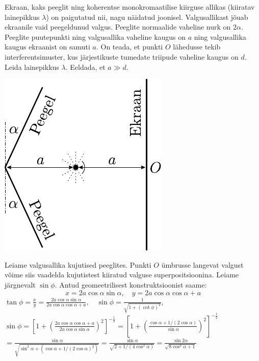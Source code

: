 
Ekraan, kaks peeglit ning koherentse monokromaatilise kiirguse allikas (kiiratav lainepikkus $\lambda$) on paigutatud nii, nagu näidatud joonisel. Valgusallikast jõuab ekraanile vaid peegeldunud valgus. Peeglite normaalide vaheline nurk on $2 \alpha$. Peeglite puutepunkti ning valgusallika vaheline kaugus on $a$ ning valgusallika kaugus ekraanist on samuti $a$. On teada, et punkti $O$ lähedusse tekib interferentsimuster, kus järjestikuste tumedate triipude vaheline kaugus on $d$. Leida lainepikkus $\lambda .$ Eeldada, et $a \gg d$.
\begin{center}
	\includegraphics[width=0.6\linewidth]{2004-v3g-09-yl.pdf}
\end{center}

\hint

\solu
Leiame valgusallika kujutised peeglites. Punkti $O$ ümbrusse langevat valgust võime siis vaadelda kujutistest kiiratud valguse superpositsioonina. Leiame järgnevalt $\sin \phi .$ Antud geomeetrilisest konstruktsioonist saame:
$$
x=2 a \cos \alpha \sin \alpha, \quad y=2 a \cos \alpha \cos \alpha+a
$$
$\tan \phi=\frac{x}{y}=\frac{2 a \cos \alpha \sin \alpha}{2 a \cos \alpha \cos \alpha+a}, \quad \sin \phi=\frac{1}{\sqrt{1+(\cot \phi)^{2}}}$,
$\sin \phi=\left[1+\left(\frac{2 a \cos \alpha \cos \alpha+a}{2 a \cos \alpha \sin \alpha}\right)^{2}\right]^{-\frac{1}{2}}=\left[1+\left(\frac{\cos \alpha+1 /(2 \cos \alpha)}{\sin \alpha}\right)^{2}\right]^{-\frac{1}{2}}$
$=\frac{\sin \alpha}{\sqrt{\sin ^{2} \alpha+\left(\cos \alpha+1 /(2 \cos \alpha)^{2}\right)}}=\frac{\sin \alpha}{\sqrt{2+1 /\left(4 \cos ^{2} \alpha\right)}}=\frac{\sin 2 \alpha}{\sqrt{8 \cos ^{2} \alpha+1}}$

